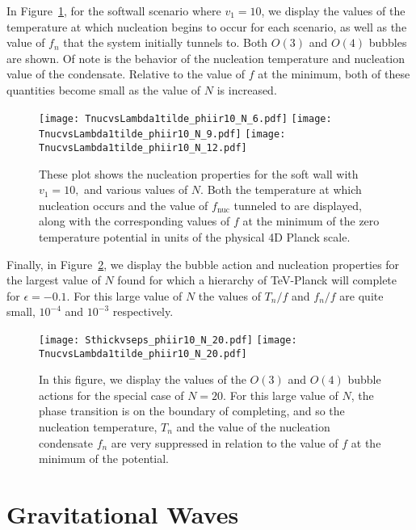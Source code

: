\documentclass[12pt]{article}
\begin{document}
In Figure~\ref{fig:nucleation}, for the softwall scenario where $v_1 = 10$, we display the values of the temperature at which nucleation begins to occur for each scenario, as well as the value of $f_n$ that the system initially tunnels to.  Both $O(3)$ and $O(4)$ bubbles are shown.  Of note is the behavior of the nucleation temperature and nucleation value of the condensate.  Relative to the value of $f$ at the minimum, both of these quantities become small as the value of $N$ is increased.  
\begin{figure}[!htbp]
	\centering
	\texttt{[image: TnucvsLambda1tilde\_phiir10\_N\_6.pdf]}
	\texttt{[image: TnucvsLambda1tilde\_phiir10\_N\_9.pdf]}
	\texttt{[image: TnucvsLambda1tilde\_phiir10\_N\_12.pdf]}
\caption{These plot shows the nucleation properties for the soft wall with $v_1 = 10,$ and various values of $N$.  Both the temperature at which nucleation occurs and the value of $f_\text{nuc}$ tunneled to are displayed, along with the corresponding values of $f$ at the minimum of the zero temperature potential in units of the physical 4D Planck scale.}
\label{fig:nucleation}
\end{figure}
Finally, in Figure~\ref{fig:N20}, we display the bubble action and nucleation properties for the largest value of $N$ found for which a hierarchy of TeV-Planck will complete for $\epsilon = -0.1$.  For this large value of $N$ the values of $T_n/f$ and $f_n/f$ are quite small, $10^{-4}$ and $10^{-3}$ respectively.



\begin{figure}[!htbp]
	\centering
	\texttt{[image: Sthickvseps\_phiir10\_N\_20.pdf]}
	\texttt{[image: TnucvsLambda1tilde\_phiir10\_N\_20.pdf]}
	\caption{In this figure, we display the values of the $O(3)$ and $O(4)$ bubble actions for the special case of $N=20$.  For this large value of $N$, the phase transition is on the boundary of completing, and so the nucleation temperature, $T_n$ and the value of the nucleation condensate $f_n$ are very suppressed in relation to the value of $f$ at the minimum of the potential.}
\label{fig:N20}
\end{figure}




\section{Gravitational Waves}
\end{document}
